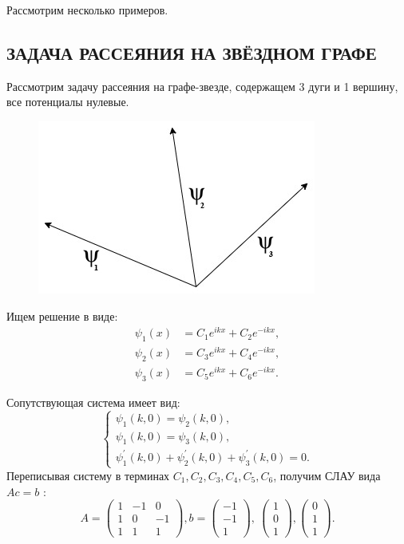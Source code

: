 \documentclass[a4 paper, 12 pt]{extarticle}
\begin{document}
  Рассмотрим несколько примеров.
  
  \subsection{ЗАДАЧА РАССЕЯНИЯ НА ЗВЁЗДНОМ ГРАФЕ}
  Рассмотрим задачу рассеяния на графе-звезде, содержащем 3 дуги и 1 вершину, все потенциалы нулевые.
  \begin{figure}[!htb]
  	\centering
  	\includegraphics[scale=0.5]{star.jpg}
  \end{figure}
  Ищем решение в виде:
  \[\begin{split}
  \psi_1\left(x\right) &= C_1 e^{ikx} + C_2 e^{-ikx}, \\
  \psi_2\left(x\right) &= C_3 e^{ikx} + C_4 e^{-ikx}, \\
  \psi_3\left(x\right) &= C_5 e^{ikx} + C_6 e^{-ikx}.
  \end{split}\]
  
  Сопутствующая система имеет вид:
  \[\begin{cases}
  \psi_{1}\left(k,0\right)=\psi_2\left(k,0\right), \\
  \psi_{1}\left(k,0\right)=\psi_3\left(k,0\right), \\
  \psi_1^\prime\left(k,0\right)+\psi_2^\prime\left(k,0\right)+\psi_3^\prime\left(k,0\right)=0.
  \end{cases}
  \]
   Переписывая систему в терминах $C_1,C_2,C_3,C_4,C_5,C_6$, получим СЛАУ вида $Ac=b$ :
   \[ A = \left(\begin{smallmatrix}
   1 & -1 & 0 \\
   1 & 0 & -1 \\
   1 & 1 & 1
   \end{smallmatrix}\right), b = \left(\begin{smallmatrix}
   -1 \\
   -1 \\
   1
   \end{smallmatrix}\right), \ 
   \left(\begin{smallmatrix}
   1 \\
   0 \\
   1
   \end{smallmatrix}\right),
   \left(\begin{smallmatrix}
   0 \\
   1 \\
   1
   \end{smallmatrix}\right).\]
   
\end{document}
